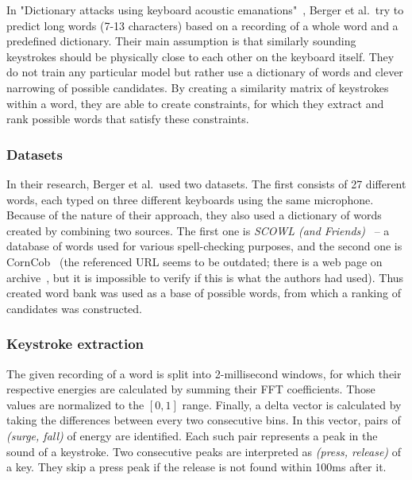 \documentclass[../main.tex]{subfiles}
\begin{document}
In "Dictionary attacks using keyboard acoustic emanations"~\cite{dict2006}, Berger et al.\ try to predict long words (7-13 characters) based on a recording of a whole word and a predefined dictionary. Their main assumption is that similarly sounding keystrokes should be physically close to each other on the keyboard itself. They do not train any particular model but rather use a dictionary of words and clever narrowing of possible candidates. By creating a similarity matrix of keystrokes within a word, they are able to create constraints, for which they extract and rank possible words that satisfy these constraints.

\subsubsection{Datasets}
In their research, Berger et al.\ used two datasets. The first consists of 27 different words, each typed on three different keyboards using the same microphone. Because of the nature of their approach, they also used a dictionary of words created by combining two sources. The first one is \textit{SCOWL (and Friends)}~\cite{dictionary_attack_scowl} -- a database of words used for various spell-checking purposes, and the second one is CornCob~\cite{dictionary_attack_corncob} (the referenced URL seems to be outdated; there is a web page on archive~\cite{dictionary_attack_fix}, but it is impossible to verify if this is what the authors had used). Thus created word bank was used as a base of possible words, from which a ranking of candidates was constructed.

\subsubsection{Keystroke extraction}
The given recording of a word is split into 2-millisecond windows, for which their respective energies are calculated by summing their FFT coefficients. Those values are normalized to the $[0, 1]$ range. Finally, a delta vector is calculated by taking the differences between every two consecutive bins. In this vector, pairs of \textit{(surge, fall)} of energy are identified. Each such pair represents a peak in the sound of a keystroke. Two consecutive peaks are interpreted as \textit{(press, release)} of a key. They skip a press peak if the release is not found within 100ms after it.
\end{document}
